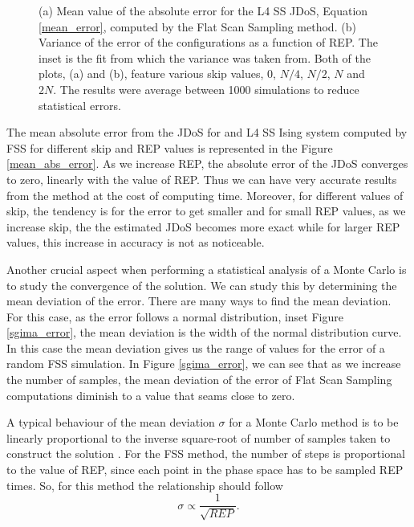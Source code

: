 \begin{figure}[h]
	\centering
	\caption{(a) Mean value of the absolute error for the L4 SS JDoS, Equation \ref{mean_error}, computed by the Flat Scan Sampling method. (b) Variance of the error of the configurations as a function of REP. The inset is the fit from which the variance was taken from. Both of the plots, (a) and (b), feature various skip values, $0$, $N/4$, $N/2$, $N$ and $2N$. The results were average between 1000 simulations to reduce statistical errors.}
\end{figure}

	The mean absolute error from the JDoS for and L4 SS Ising system computed by FSS for different skip and REP values is represented in the Figure \ref{mean_abs_error}. As we increase REP, the absolute error of the JDoS converges to zero, linearly with the value of REP. Thus we can have very accurate results from the method at the cost of computing time. 
Moreover, for different values of skip, the tendency is for the error to get smaller and for small REP values, as we increase skip, the the estimated JDoS becomes more exact while for larger REP values, this increase in accuracy is not as noticeable.

	Another crucial aspect when performing a statistical analysis of a Monte Carlo is to study the convergence of the solution. We can study this by determining the mean deviation of the error. There are many ways to find the mean deviation. For this case, as the error follows a normal distribution, inset Figure \ref{sgima_error}, the mean deviation is the width of the normal distribution curve. In this case the mean deviation gives us the range of values for the error of a random FSS simulation. In Figure \ref{sgima_error}, we can see that as we increase the number of samples, the mean  deviation of the error of Flat Scan Sampling computations diminish to a value that seams close to zero.
	
	A typical behaviour of the mean deviation $\sigma$ for a Monte Carlo method is to be linearly proportional to the inverse square-root of number of samples taken to construct the solution \cite{Landau_Book}. For the FSS method, the number of steps is proportional to the value of REP, since each point in the phase space has to be sampled REP times. So, for this method the relationship should follow 
\begin{equation}\label{standard_mc}
	\sigma \propto \frac{1}{\sqrt{REP}}.
\end{equation}

